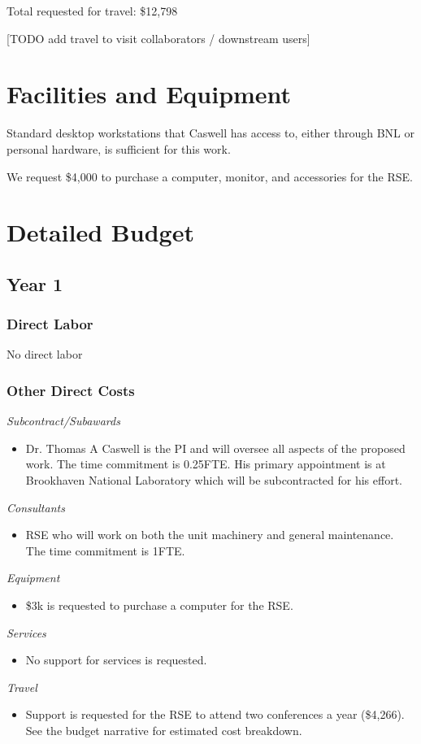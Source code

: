 \documentclass[12pt]{article}
\numberwithin{page}{section}
\begin{document}
Total requested for travel: \$12,798

[TODO add travel to visit collaborators / downstream users]

\newpage
\section{Facilities and Equipment}
\setcounter{page}{1}

Standard desktop workstations that Caswell has access to, either
through BNL or personal hardware, is sufficient for this work.

We request \$4,000 to purchase a computer, monitor, and accessories
for the RSE.

\newpage
\section{Detailed Budget}
\setcounter{page}{1}
\subsection{Year 1}
\subsubsection{Direct Labor}
No direct labor
\subsubsection{Other Direct Costs}
\textit{Subcontract/Subawards}
\begin{itemize}
\item Dr. Thomas A Caswell is the PI and will oversee all aspects of the
  proposed work.  The time commitment is 0.25FTE.  His primary
  appointment is at Brookhaven National Laboratory which will be
  subcontracted for his effort.
\end{itemize}
\textit{Consultants}
\begin{itemize}
\item RSE who will work on both the unit machinery and general
  maintenance.  The time commitment is 1FTE.
\end{itemize}
\textit{Equipment}
\begin{itemize}
\item \$3k is requested to purchase a computer for the RSE.
\end{itemize}
\textit{Services}
\begin{itemize}
\item No support for services is requested.
\end{itemize}
\textit{Travel}
\begin{itemize}
\item Support is requested for the RSE to attend two conferences a
  year (\$4,266).  See the budget narrative for estimated cost
  breakdown.
\end{itemize}
\end{document}
